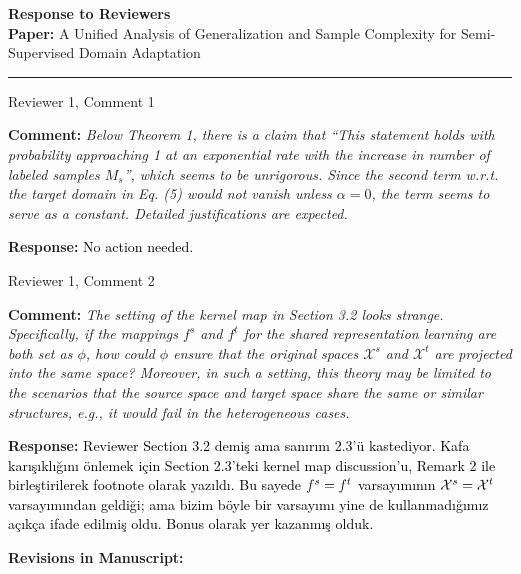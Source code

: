 \documentclass[11pt]{article}
\newcommand{\ReviewerText}[1]{%
    \begin{tcolorbox}[
        enhanced, frame hidden, colback=revbg,
        left=5pt, right=5pt, top=5pt, bottom=5pt, arc=2pt
    ]
        \textbf{\textcolor{revtitle}{Comment:}} 
        \itshape \textcolor{black!80}{#1}
    \end{tcolorbox}
    \vspace{0.05cm}
}
\newcommand{\AuthorResponse}[1]{%
    \begin{tcolorbox}[
        enhanced, frame hidden, colback=authbg,
        left=5pt, right=5pt, top=5pt, bottom=5pt, arc=2pt
    ]
        \textbf{\textcolor{authtitle}{Response:}} 
        \normalfont \textcolor{black}{#1}
    \end{tcolorbox}
    \vspace{0.1cm}
}
\newcommand{\AutoRevision}[1]{%
    \begin{tcolorbox}[
        enhanced, breakable,
        colback=revisionbg, frame hidden,
        borderline west={3pt}{0pt}{blue!40}, %
        left=5pt, right=5pt, top=5pt, bottom=5pt,
        arc=2pt 
    ]
        \textbf{\textcolor{blue!40!black}{Revisions in Manuscript:}}
        
        \renewcommand{\do}[1]{%
            \par\vspace{0.3cm} %
            
            {\small\bfseries\color{blue!60!black} $\hookrightarrow$ Section \ref{rev:##1}, Page \pageref{rev:##1}:}
            
            \par\nopagebreak
            \begingroup
            \itshape\small \Paste{text:##1}
            \endgroup
        }
        \docsvlist{#1} %
    \end{tcolorbox}
}
\newcommand{\PlainRevision}[1]{%
    \begin{tcolorbox}[
        enhanced, breakable,
        colback=revisionbg, frame hidden,
        borderline west={3pt}{0pt}{blue!40}, %
        left=5pt, right=5pt, top=5pt, bottom=5pt,
        arc=2pt
    ]
        \textbf{\textcolor{blue!40!black}{Possible Revisions in Manuscript:}}

        \docsvlist{#1}
        
    \end{tcolorbox}
}
\begin{document}
\begin{center}
    {\Large \textbf{Response to Reviewers}}\\[0.5em]
    \textbf{Paper:} A Unified Analysis of Generalization and Sample Complexity for Semi-Supervised Domain Adaptation
\end{center}
\hrule \vspace{1em}

\begin{ReviewCycle}{Reviewer 1, Comment 1}
    \ReviewerText{Below Theorem 1, there is a claim that “This statement holds with probability approaching 1 at an exponential rate with the increase in number of labeled samples $M_s$”, which seems to be unrigorous. Since the second term w.r.t. the target domain in Eq. (5) would not vanish unless $\alpha=0$, the term seems to serve as a constant. Detailed justifications are expected.
    }
    \AuthorResponse{No action needed.}
\end{ReviewCycle}


\begin{ReviewCycle}{Reviewer 1, Comment 2}
    \ReviewerText{
        The setting of the kernel map in Section 3.2 looks strange. Specifically, if the mappings $f^s$ and $f^t$ for the shared representation learning are both set as $\phi$, how could $\phi$ ensure that the original spaces $\mathcal{X}^s$ and $\mathcal{X}^t$ are projected into the same space? Moreover, in such a setting, this theory may be limited to the scenarios that the source space and target space share the same or similar structures, e.g., it would fail in the heterogeneous cases.
    }
    \AuthorResponse{Reviewer Section 3.2 demiş ama sanırım 2.3'ü kastediyor. Kafa karışıklığını önlemek için Section 2.3'teki kernel map discussion'u, Remark 2 ile birleştirilerek footnote olarak yazıldı. Bu sayede $f^s = f^t$ varsayımının $\mathcal{X}^s = \mathcal{X}^t$ varsayımından geldiği; ama bizim böyle bir varsayımı yine de kullanmadığımız açıkça ifade edilmiş oldu. Bonus olarak yer kazanmış olduk.
    }
    \AutoRevision{1.2}
        
    

\end{ReviewCycle}
\end{document}
